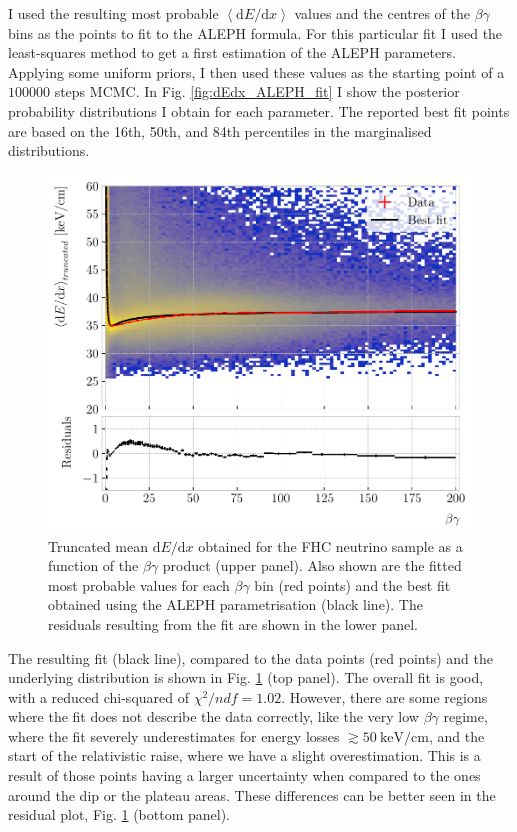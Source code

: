 I used the resulting most probable $\left<\mathrm{d}E/\mathrm{d}x\right>$ values and the centres of the $\beta\gamma$ bins as the points to fit to the ALEPH formula. For this particular fit I used the least-squares method to get a first estimation of the ALEPH parameters. Applying some uniform priors, I then used these values as the starting point of a $100000$ steps MCMC. In Fig. \ref{fig:dEdx_ALEPH_fit} I show the posterior probability distributions I obtain for each parameter. The reported best fit points are based on the 16th, 50th, and 84th percentiles in the marginalised distributions.

\begin{figure}[t]
	\centering
	\includegraphics[width=.85\linewidth]{Images/GArSoft_PID/dEdx/dEdx_aleph_data_with_fit.pdf}
	\caption{Truncated mean $\mathrm{d}E/\mathrm{d}x$ obtained for the FHC neutrino sample as a function of the $\beta\gamma$ product (upper panel). Also shown are the fitted most probable values for each $\beta\gamma$ bin (red points) and the best fit obtained using the ALEPH parametrisation (black line). The residuals resulting from the fit are shown in the lower panel.}
	\label{fig:dEdx_betagamma_ALEPH}
\end{figure}

The resulting fit (black line), compared to the data points (red points) and the underlying distribution is shown in Fig. \ref{fig:dEdx_betagamma_ALEPH} (top panel). The overall fit is good, with a reduced chi-squared of $\chi^{2}/ndf=1.02$. However, there are some regions where the fit does not describe the data correctly, like the very low $\beta\gamma$ regime, where the fit severely underestimates for energy losses $\gtrsim 50 ~ \mathrm{keV}/\mathrm{cm}$, and the start of the relativistic raise, where we have a slight overestimation. This is a result of those points having a larger uncertainty when compared to the ones around the dip or the plateau areas. These differences can be better seen in the residual plot, Fig. \ref{fig:dEdx_betagamma_ALEPH} (bottom panel).

